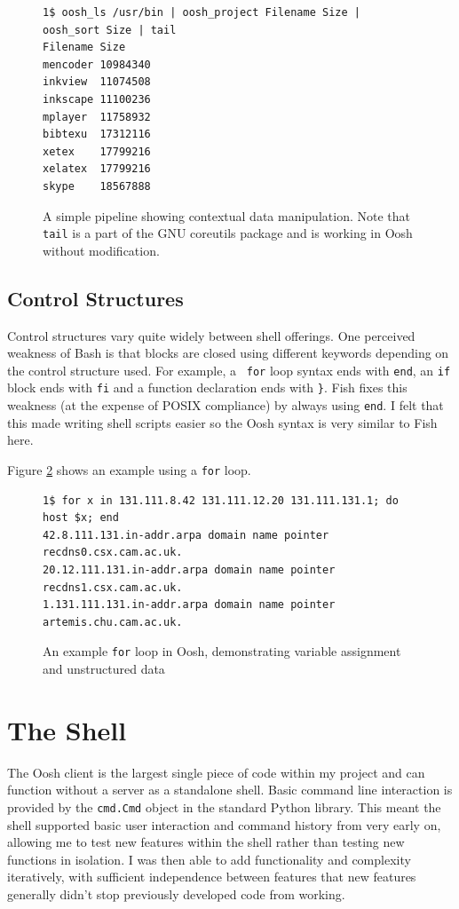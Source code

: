 \documentclass[12pt,twoside,notitlepage]{report}
\begin{document}
\begin{figure}[h]
\begin{verbatim}
1$ oosh_ls /usr/bin | oosh_project Filename Size | oosh_sort Size | tail
Filename Size
mencoder 10984340
inkview  11074508
inkscape 11100236
mplayer  11758932
bibtexu  17312116
xetex    17799216
xelatex  17799216
skype    18567888
\end{verbatim}
  \caption{A simple pipeline showing contextual data
    manipulation. Note that {\tt tail} is a part of the GNU coreutils
    package and is working in Oosh without modification.}
\label{lsexample}
\end{figure}

\subsection{Control Structures}
\label{forexample}

Control structures vary quite widely between shell offerings. One
perceived weakness of Bash is that blocks are closed using different
keywords depending on the control structure used. For example, a {\tt
  for} loop syntax ends with {\tt end}, an {\tt if} block ends with
{\tt fi} and a function declaration ends with {\tt \}}. Fish fixes
this weakness (at the expense of POSIX compliance) by always using
{\tt end}. I felt that this made writing shell scripts easier so the
Oosh syntax is very similar to Fish here.

Figure \ref{forloop} shows an example using a {\tt for} loop.

\begin{figure}[h]
\begin{verbatim}
1$ for x in 131.111.8.42 131.111.12.20 131.111.131.1; do host $x; end
42.8.111.131.in-addr.arpa domain name pointer recdns0.csx.cam.ac.uk.
20.12.111.131.in-addr.arpa domain name pointer recdns1.csx.cam.ac.uk.
1.131.111.131.in-addr.arpa domain name pointer artemis.chu.cam.ac.uk.
\end{verbatim}
\caption{An example {\tt for} loop in Oosh, demonstrating variable
  assignment and unstructured data}
\label{forloop}
\end{figure}

\section{The Shell}
The Oosh client is the largest single piece of code within my project
and can function without a server as a standalone shell. Basic command
line interaction is provided by the {\tt cmd.Cmd} object in the
standard Python library. This meant the shell supported basic user
interaction and command history from very early on, allowing me to
test new features within the shell rather than testing new functions
in isolation. I was then able to add functionality and complexity
iteratively, with sufficient independence between features that new
features generally didn't stop previously developed code from working.
\end{document}
